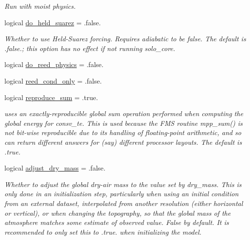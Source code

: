 \begin{DoxyCompactItemize}
\begin{DoxyCompactList}\small\item\em Run with moist physics. \end{DoxyCompactList}\item 
logical \hyperlink{structfv__arrays__mod_1_1fv__flags__type_a34c703efb3ef0937e06ef5bf9b450a7f}{do\-\_\-held\-\_\-suarez} = .false.
\begin{DoxyCompactList}\small\item\em Whether to use Held-\/\-Suarez forcing. Requires adiabatic to be false. The default is .false.; this option has no effect if not running solo\-\_\-core. \end{DoxyCompactList}\item 
logical \hyperlink{structfv__arrays__mod_1_1fv__flags__type_ad305f75672841755e41c89f48a78377f}{do\-\_\-reed\-\_\-physics} = .false.
\item 
logical \hyperlink{structfv__arrays__mod_1_1fv__flags__type_a1ce5860dce6be701f06ad37631322dca}{reed\-\_\-cond\-\_\-only} = .false.
\item 
logical \hyperlink{structfv__arrays__mod_1_1fv__flags__type_a43ba9fca6402ea52dcdbe845b1589517}{reproduce\-\_\-sum} = .true.
\begin{DoxyCompactList}\small\item\em uses an exactly-\/reproducible global sum operation performed when computing the global energy for consv\-\_\-te. This is used because the F\-M\-S routine mpp\-\_\-sum() is not bit-\/wise reproducible due to its handling of floating-\/point arithmetic, and so can return different answers for (say) different processor layouts. The default is .true. \end{DoxyCompactList}\item 
logical \hyperlink{structfv__arrays__mod_1_1fv__flags__type_a85c6e8042f8613458bc65a948aaa0125}{adjust\-\_\-dry\-\_\-mass} = .false.
\begin{DoxyCompactList}\small\item\em Whether to adjust the global dry-\/air mass to the value set by dry\-\_\-mass. This is only done in an initialization step, particularly when using an initial condition from an external dataset, interpolated from another resolution (either horizontal or vertical), or when changing the topography, so that the global mass of the atmosphere matches some estimate of observed value. False by default. It is recommended to only set this to .true. when initializing the model. \end{DoxyCompactList}\item 

\end{DoxyCompactItemize}
